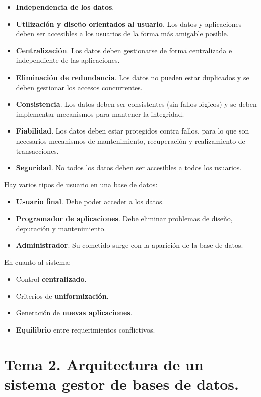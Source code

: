 \documentclass[12pt,spanish]{article}
\numberwithin{definition}{subsection}
\begin{document}
\begin{itemize}
	\item \textbf{Independencia de los datos}.
	\item \textbf{Utilización y diseño orientados al usuario}. Los datos y aplicaciones deben ser accesibles a los usuarios de la forma más amigable posible.
	\item \textbf{Centralización}. Los datos deben gestionarse de forma centralizada e independiente de las aplicaciones.
	\item \textbf{Eliminación de redundancia}. Los datos no pueden estar duplicados y se deben gestionar los accesos concurrentes.
	\item \textbf{Consistencia}. Los datos deben ser consistentes (sin fallos lógicos) y se deben implementar mecanismos para mantener la integridad.
	\item \textbf{Fiabilidad}. Los datos deben estar protegidos contra fallos, para lo que son necesarios mecanismos de mantenimiento, recuperación y realizamiento de transacciones.
	\item \textbf{Seguridad}. No todos los datos deben ser accesibles a todos los usuarios.
\end{itemize}

Hay varios tipos de usuario en una base de datos:

\begin{itemize}
	\item \textbf{Usuario final}. Debe poder acceder a los datos.
	\item \textbf{Programador de aplicaciones}. Debe eliminar problemas de diseño, depuración y mantenimiento.
	\item \textbf{Administrador}. Su cometido surge con la aparición de la base de datos.
\end{itemize}

En cuanto al sistema:

\begin{itemize}
	\item Control \textbf{centralizado}.
	\item Criterios de \textbf{uniformización}.
	\item Generación de \textbf{nuevas aplicaciones}.
	\item \textbf{Equilibrio} entre requerimientos conflictivos.
\end{itemize}

\section{Tema 2. Arquitectura de un sistema gestor de bases de datos.}
\end{document}

